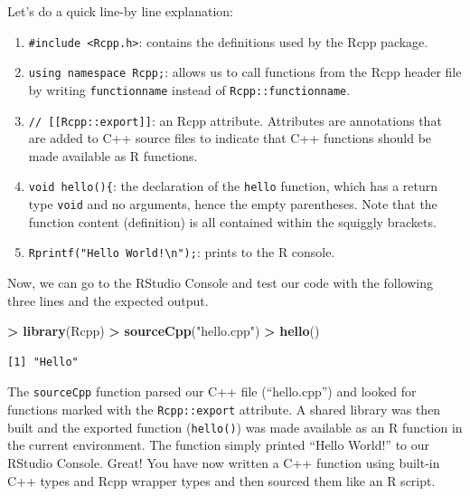 \documentclass[
]{krantz}
\makeatletter
\newenvironment{Shaded}{\begin{snugshade}}{\end{snugshade}}
\newcommand{\KeywordTok}[1]{\textcolor[rgb]{0.27,0.27,0.27}{\textbf{#1}}}
\newcommand{\NormalTok}[1]{#1}
\newcommand{\OperatorTok}[1]{\textcolor[rgb]{0.43,0.43,0.43}{\textbf{#1}}}
\newcommand{\StringTok}[1]{\textcolor[rgb]{0.5,0.5,0.5}{#1}}
\providecommand{\tightlist}{%
  \setlength{\itemsep}{0pt}\setlength{\parskip}{0pt}}
\newenvironment{kframe}{%
\medskip{}
\setlength{\fboxsep}{.8em}
 \def\at@end@of@kframe{}%
 \ifinner\ifhmode%
  \def\at@end@of@kframe{\end{minipage}}%
  \begin{minipage}{\columnwidth}%
 \fi\fi%
 \def\FrameCommand##1{\hskip\@totalleftmargin \hskip-\fboxsep
 \colorbox{shadecolor}{##1}\hskip-\fboxsep
     \hskip-\linewidth \hskip-\@totalleftmargin \hskip\columnwidth}%
 \MakeFramed {\advance\hsize-\width
   \@totalleftmargin\z@ \linewidth\hsize
   \@setminipage}}%
 {\par\unskip\endMakeFramed%
 \at@end@of@kframe}
\renewenvironment{Shaded}{\begin{kframe}}{\end{kframe}}
\makeatother
\begin{document}
Let's do a quick line-by line explanation:

\begin{enumerate}
\def\labelenumi{\arabic{enumi}.}
\tightlist
\item
  \texttt{\#include\ \textless{}Rcpp.h\textgreater{}}: contains the definitions used by the Rcpp package.

  \item

  \texttt{using\ namespace\ Rcpp;}: allows us to call functions from the Rcpp header file by writing \texttt{functionname} instead of \texttt{Rcpp::functionname}.

  \item

  \texttt{//\ {[}{[}Rcpp::export{]}{]}}: an Rcpp attribute. Attributes are annotations that are added to C++ source files to indicate that C++ functions should be made available as R functions.

  \item

  \texttt{void\ hello()\{}: the declaration of the \texttt{hello} function, which has a return type \texttt{void} and no arguments, hence the empty parentheses. Note that the function content (definition) is all contained within the squiggly brackets.

  \item

  \texttt{Rprintf("Hello\ World!\textbackslash{}n");}: prints to the R console.
\end{enumerate}

Now, we can go to the RStudio Console and test our code with the following three lines and the expected output.

\begin{Shaded}
\begin{Highlighting}[]
\OperatorTok{\textgreater{}}\StringTok{ }\KeywordTok{library}\NormalTok{(Rcpp)}
\OperatorTok{\textgreater{}}\StringTok{ }\KeywordTok{sourceCpp}\NormalTok{(}\StringTok{"hello.cpp"}\NormalTok{)}
\OperatorTok{\textgreater{}}\StringTok{ }\KeywordTok{hello}\NormalTok{()}
\end{Highlighting}
\end{Shaded}

\begin{verbatim}
[1] "Hello"
\end{verbatim}

The \texttt{sourceCpp} function parsed our C++ file (``hello.cpp'') and looked for functions marked with the \texttt{Rcpp::export} attribute. A shared library was then built and the exported function (\texttt{hello()}) was made available as an R function in the current environment. The function simply printed ``Hello World!'' to our RStudio Console. Great! You have now written a C++ function using built-in C++ types and Rcpp wrapper types and then sourced them like an R script.
\end{document}
